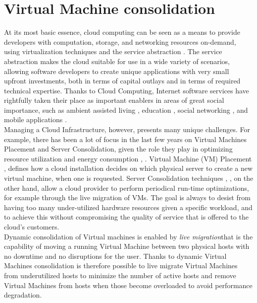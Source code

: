 
\section{Virtual Machine consolidation}
\label{sec:sota_vm_cons}

At its most basic essence, cloud computing can be seen as a means to provide developers with computation, storage, and networking resources on-demand, using virtualization techniques and the service abstraction \cite{Armbrust:2010ee}. The service abstraction makes the cloud suitable for use in a wide variety of scenarios, allowing software developers to create unique applications with very small upfront investments, both in terms of capital outlays and in terms of required technical expertise. Thanks to Cloud Computing, Internet software services have rightfully taken their place as important enablers in areas of great social importance, such as ambient assisted living \cite{Zhang:2011dq}, education \cite{Sultan:2010fd}, social networking \cite{Chard:2010eh}, and mobile applications \cite{Fernando:2013ip}.\\
Managing a Cloud Infrastructure, however, presents many unique challenges. For example, there has been a lot of focus in the last few years on Virtual Machines Placement and Server Consolidation, given the role they play in optimizing resource utilization and energy consumption \cite{Feller:2012kf}, \cite{Goudarzi:2012gw}. Virtual Machine (VM) Placement \cite{Meng:2010im}, \cite{Xu:2010df} defines how a cloud installation decides on which physical server to create a new virtual machine, when one is requested. Server Consolidation techniques \cite{Wuhib:2012vq}, \cite{Corradi:2014fe}, on the other hand, allow a cloud provider to perform periodical run-time optimizations, for example through the live migration of VMs. The goal is always to desist from having too many under-utilized hardware resources given a specific workload, and to achieve this without compromising the quality of service that is offered to the cloud’s customers.\\
Dynamic consolidation of Virtual machines is enabled by \textit{live migration}that is the capability of moving a running Virtual Machine between two physical hosts with no downtime and no disruptions for the user. Thanks to dynamic Virtual Machines consolidation is therefore possible to live migrate Virtual Machines from underutilized hosts to minimize the number of active hosts and remove Virtual Machines from hosts when those become overloaded to avoid performance degradation.


